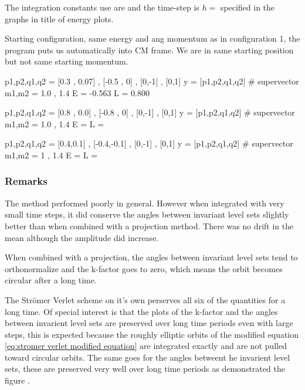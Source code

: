\documentclass[12pt]{article}
\begin{document}
The integration constants use are  and the time-step is $h =$  specified in the graphs in title of energy plots.

Starting configuration, same energy and ang momentum as in configuration 1, the program puts us automatically into CM frame. We are in same starting position but not same starting momentum.

\begin{python}
p1,p2,q1,q2 = [0.3 , 0.07] , [-0.5 , 0] , [0,-1] , [0,1]
y = [p1,p2,q1,q2] # supervector
m1,m2 = 1.0 , 1.4
E = -0.563
L = 0.800
\end{python}


\begin{python}
p1,p2,q1,q2 = [0.8 , 0.0] , [-0.8 , 0] , [0,-1] , [0,1]
y = [p1,p2,q1,q2] # supervector
m1,m2 = 1.0 , 1.4
E = 
L = 
\end{python}


\begin{python}
p1,p2,q1,q2 = [0.4,0.1] , [-0.4,-0.1] , [0,-1] , [0,1]
y = [p1,p2,q1,q2] # supervector
m1,m2 = 1 , 1.4
E = 
L =
\end{python}


\subsubsection{Remarks}

The method performed poorly in general. However when integrated with very small time steps, it did conserve the angles between invariant level sets slightly better than when combined with a projection method. There was no drift in the mean although the amplitude did increase. 

When combined with a projection, the angles between invariant level sets tend to orthonormalize and the k-factor goes to zero, which means the orbit becomes circular after a long time. 

The Str\"omer Verlet scheme on it's own perserves all six of the quantities for a long time. Of special interest is that the plots of the k-factor and the angles between invarient level sets are preserved over long time periods even with large steps, this is expected because the roughly elliptic orbits of the modified equation \eqref{eq:stromer verlet modified equation} are integrated exactly and are not pulled toward circular orbits. The same goes for the angles betweent he invarient level sets, these are preserved very well over long time periods as demonstrated the figure . 
\end{document}
